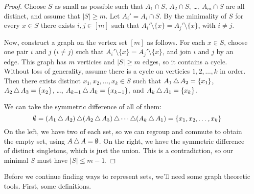 \begin{proof}	
Choose $S$ as small as possible such that $A_1\cap S$, $A_2\cap S$, \ldots, $A_m\cap S$ are all distinct, and assume that $|S| \geq m$.
Let $A_i' = A_i\cap S$. By the minimality of $S$ for every $x\in S$ there exists $i,j\in[m]$ such that $A_i'\setminus \{x\} = A_j'\setminus \{x\}$, with $i\neq j$.

Now, construct a graph  on the vertex set $[m]$ as follows. For each $x\in S$, choose one pair $i$ and $j$ ($i\neq j$) such that $A_i'\setminus \{x\} = A_j'\setminus \{x\}$, and join $i$ and $j$ by an edge. 
This graph has $m$ verticies and $|S|\geq m$ edges, so it contains a cycle. Without loss of generality, assume there is a cycle on verticies $1,2,\dotsc,k$ in order. Then there exists distinct $x_1,x_2,\dotsc,x_k\in S$ such that $A_1\operatorname{\triangle} A_2 = \{x_1\}$, $A_2\operatorname{\triangle} A_3 = \{x_2\}$, \ldots, $A_{k-1}\operatorname{\triangle} A_k = \{x_{k-1}\}$, and $A_k \operatorname{\triangle} A_1 = \{x_k\}$. 

We can take the symmetric difference of all of them:
\[
\emptyset = (A_1\operatorname{\triangle} A_2) \operatorname{\triangle} (A_2 \operatorname{\triangle} A_3) \operatorname{\triangle} \dotsm \operatorname{\triangle} (A_k \operatorname{\triangle} A_1) = \{x_1,x_2,\dotsc, x_k\}
\]
On the left, we have two of each set, so we can regroup and commute to obtain the empty set, using $A\operatorname{\triangle} A = \emptyset$. On the right, we have the symmetric difference of distinct singletons, which is just the union. This is a contradiction, so our minimal $S$ must have $|S|\leq m-1$.
\end{proof}
Before we continue finding ways to represent sets, we'll need some graph theoretic tools. First, some definitions.
